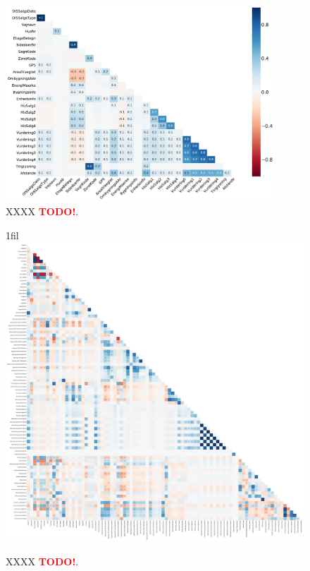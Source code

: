 \documentclass[a4paper, twoside, nobib]{tufte-book}
\makeatletter
\newcommand*{\centerfloat}{%
  \parindent \z@
  \leftskip \z@ \@plus 1fil \@minus \textwidth
  \rightskip\leftskip
  \parfillskip \z@skip}
\newcommand{\TODO}{\textcolor{red}{\bf TODO!}\xspace}
\makeatother
\begin{document}
\begin{figure}[h!]
  \includegraphics[draft, width=0.9\textwidth, trim=10 10 10 10, clip]{figures/housing/missing_heatmap.pdf}
  \caption[Validity Heatmap]
          {XXXX \TODO.}
  \label{fig:h:nans_heatmap}
\end{figure}


% 




\begin{figure}[h!]
  \centerfloat
  \includegraphics[draft, width=1.1\textwidth, trim=10 10 10 10, clip]{figures/housing/correlations_all.pdf}
  \caption[Linear Correlations]
          {XXXX \TODO.}
  \label{fig:h:correlations_all_lin}
\end{figure}
\end{document}
